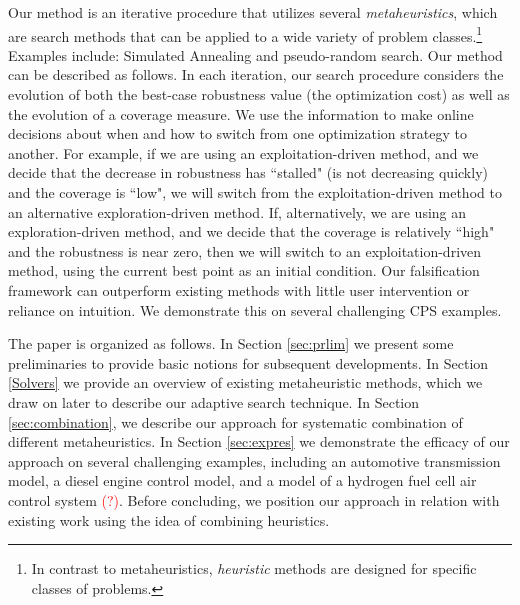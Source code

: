 Our method is an iterative procedure that utilizes several 
\emph{metaheuristics}, which are search methods that can be applied to
a wide variety of problem classes.\footnote{In contrast to metaheuristics, \emph{heuristic} methods are 
designed for specific classes of problems.} Examples include: Simulated Annealing and pseudo-random search. Our method can be described as follows. 
In each iteration, our
search procedure considers the evolution of both the best-case
robustness value (the optimization cost) as well as the evolution of a
coverage measure.  We use the information to make online decisions
about when and how to switch from one optimization strategy to
another.  For example, if we are using an exploitation-driven method,
and we decide that the decrease in robustness has ``stalled" (is not
decreasing quickly) and the coverage is ``low", we will switch from
the exploitation-driven method to an alternative exploration-driven
method.  If, alternatively, we are using an exploration-driven method,
and we decide that the coverage is relatively ``high" and the
robustness is near zero, then we will switch to an exploitation-driven
method, using the current best point as an initial condition. 
Our falsification framework can outperform existing methods with little user intervention or reliance on intuition. We demonstrate this on several 
challenging CPS examples.

The paper is organized as follows. In Section \ref{sec:prlim} we present some preliminaries to provide basic notions for subsequent developments. In Section \ref{Solvers} we provide an overview of existing metaheuristic methods, which we draw on later to describe our adaptive search technique.
 In Section \ref{sec:combination}, we describe our approach for systematic combination of different metaheuristics. In Section \ref{sec:expres} we demonstrate the efficacy of our approach on several challenging examples, including an automotive transmission model, a diesel engine control model, and a model of a hydrogen fuel cell air control system \textcolor{red}{(?)}. Before concluding, we position our approach in relation with existing work using the idea of combining heuristics. 
